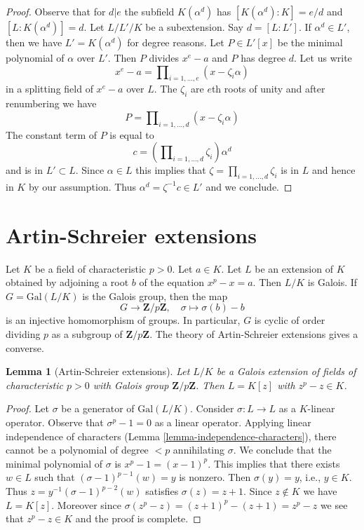 \documentclass{stacks-project}
\theoremstyle{plain}
\newtheorem{lemma}[subsection]{Lemma}
\theoremstyle{definition}
\theoremstyle{remark}
\numberwithin{equation}{subsection}
\begin{document}
\begin{proof}
Observe that for $d | e$ the subfield $K(\alpha^d)$ has
$[K(\alpha^d) : K] = e/d$ and $[L : K(\alpha^d)] = d$.
Let $L/L'/K$ be a subextension. Say $d = [L : L']$. If $\alpha^d \in L'$,
then we have $L' = K(\alpha^d)$ for degree reasons.
Let $P \in L'[x]$ be the minimal polynomial of $\alpha$ over $L'$.
Then $P$ divides $x^e - a$ and $P$ has degree $d$.
Let us write
$$
x^e - a = \prod\nolimits_{i = 1, \ldots, e} (x - \zeta_i \alpha)
$$
in a splitting field of $x^e - a$ over $L$. The $\zeta_i$ are $e$th roots
of unity and after renumbering we have
$$
P = \prod\nolimits_{i = 1, \ldots, d} (x - \zeta_i \alpha)
$$
The constant term of $P$ is equal to
$$
c = (\prod\nolimits_{i = 1, \ldots, d} \zeta_i) \alpha^d
$$
and is in $L' \subset L$. Since $\alpha \in L$ this implies that
$\zeta = \prod_{i = 1, \ldots, d} \zeta_i$ is in $L$ and hence in $K$ by
our assumption. Thus $\alpha^d = \zeta^{-1}c \in L'$ and we conclude.
\end{proof}




\section{Artin-Schreier extensions}
\label{section-Artin-Schreier}

\noindent
Let $K$ be a field of characteristic $p > 0$. Let $a \in K$. Let $L$ be an
extension of $K$ obtained by adjoining a root $b$ of the equation
$x^p - x = a$. Then $L/K$ is Galois. If $G = \text{Gal}(L/K)$ is the Galois
group, then the map
$$
G \longrightarrow \mathbf{Z}/p\mathbf{Z},\quad
\sigma \longmapsto \sigma(b) - b
$$
is an injective homomorphism of groups. In particular, $G$ is cyclic
of order dividing $p$ as a subgroup of $\mathbf{Z}/p\mathbf{Z}$.
The theory of Artin-Schreier extensions gives a converse.

\begin{lemma}[Artin-Schreier extensions]
\label{lemma-Artin-Schreier}
Let $L/K$ be a Galois extension of fields of characteristic $p > 0$
with Galois group $\mathbf{Z}/p\mathbf{Z}$. Then $L = K[z]$ with
$z^p - z \in K$.
\end{lemma}

\begin{proof}
Let $\sigma$ be a generator of $\text{Gal}(L/K)$.
Consider $\sigma : L \to L$ as a $K$-linear operator.
Observe that $\sigma^p - 1 = 0$ as a linear operator.
Applying linear independence of characters
(Lemma \ref{lemma-independence-characters}),
there cannot be a polynomial of degree $< p$
annihilating $\sigma$. We conclude that the minimal
polynomial of $\sigma$ is $x^p - 1 = (x - 1)^p$.
This implies that there exists $w \in L$ such that
$(\sigma - 1)^{p - 1}(w) = y$ is nonzero. Then
$\sigma(y) = y$, i.e., $y \in K$. Thus
$z = y^{-1}(\sigma - 1)^{p - 2}(w)$ satisfies
$\sigma(z) = z + 1$. Since $z \not \in K$ we have $L = K[z]$.
Moreover since $\sigma(z^p - z) = (z + 1)^p - (z + 1) = z^p - z$
we see that $z^p - z \in K$ and the proof is complete.
\end{proof}
\end{document}

